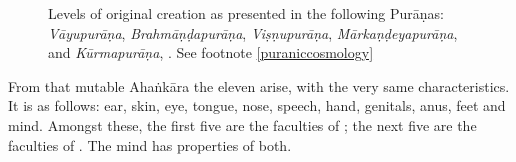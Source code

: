 \begin{translation}
\begin{figure}
              
                \caption{Levels of original creation as presented in the following 
                Purāṇas: \emph{Vāyupurāṇa}, \emph{Brahmāṇḍapurāṇa}, 
                \emph{Viṣṇupurāṇa}, \emph{Mārkaṇḍeyapurāṇa}, 
                and \emph{Kūrmapurāṇa}, \citep[after][27]{biar-1981}. 
                See footnote \ref{puraniccosmology}}
                \label{fig:biardeau1981-p27}
            \end{figure}
            
          
            
            
            From that mutable Ahaṅkāra the 
            eleven  arise, with the very same
            characteristics. It is as follows: ear, skin, eye, tongue, nose,
            speech, hand, genitals, anus, feet and mind.  Amongst these, the first 
            five are the faculties of ; the next five are the 
            faculties of .  The mind has properties of both.
            

\end{translation}
